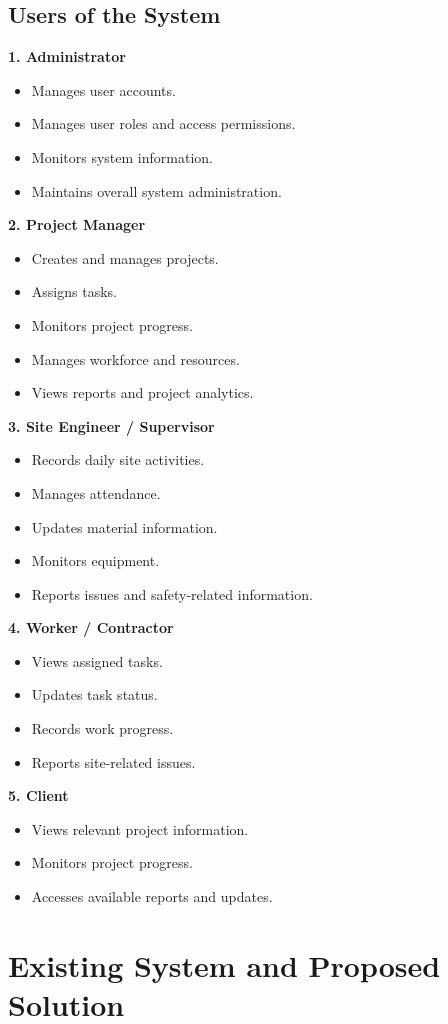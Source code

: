 \documentclass[11pt,a4paper]{article}
\begin{document}
\subsection{Users of the System}
\textbf{1. Administrator}
\begin{itemize}
\item Manages user accounts.
\item Manages user roles and access permissions.
\item Monitors system information.
\item Maintains overall system administration.
\end{itemize}
\textbf{2. Project Manager}
\begin{itemize}
\item Creates and manages projects.
\item Assigns tasks.
\item Monitors project progress.
\item Manages workforce and resources.
\item Views reports and project analytics.
\end{itemize}
\textbf{3. Site Engineer / Supervisor}
\begin{itemize}
\item Records daily site activities.
\item Manages attendance.
\item Updates material information.
\item Monitors equipment.
\item Reports issues and safety-related information.
\end{itemize}
\textbf{4. Worker / Contractor}
\begin{itemize}
\item Views assigned tasks.
\item Updates task status.
\item Records work progress.
\item Reports site-related issues.
\end{itemize}
\textbf{5. Client}
\begin{itemize}
\item Views relevant project information.
\item Monitors project progress.
\item Accesses available reports and updates.
\end{itemize}

\section{Existing System and Proposed Solution}
\end{document}
